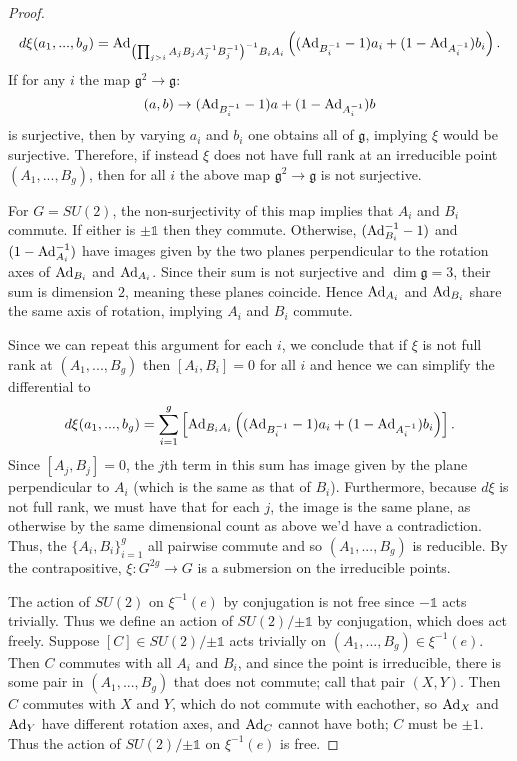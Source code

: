 \begin{proof}
		\begin{equation}
			d\xi(a_1,...,b_g) = \text{Ad}_{\left(\prod_{j>i} A_jB_jA_j^{-1}B_j^{-1}\right)^{-1}B_iA_i} \left((\text{Ad}_{B_i^{-1}}-1)a_i + (1-\text{Ad}_{A_i^{-1}})b_i\right).
		\end{equation}
		If for any $i$ the map $\mathfrak{g}^2\to\mathfrak{g}$:
		\begin{equation}
			(a,b) \to (\text{Ad}_{B_i^{-1}} - 1)a + (1-\text{Ad}_{A_i^{-1}})b
		\end{equation}
		is surjective, then by varying $a_i$ and $b_i$ one obtains all of $\mathfrak{g}$, implying $\xi$ would be surjective. Therefore, if instead $\xi$ does not have full rank at an irreducible point $(A_1,...,B_g)$, then for all $i$ the above map $\mathfrak{g}^2\to\mathfrak{g}$ is not surjective.
		
		For $G=SU(2)$, the non-surjectivity of this map implies that $A_i$ and $B_i$ commute. If either is $\pm\mathds{1}$ then they commute. Otherwise, $(\text{Ad}_{B_i}^{-1}-1)$ and $(1-\text{Ad}_{A_i}^{-1})$ have images given by the two planes perpendicular to the rotation axes of $\text{Ad}_{B_i}$ and $\text{Ad}_{A_i}$. Since their sum is not surjective and $\dim\mathfrak{g}=3$, their sum is dimension $2$, meaning these planes coincide. Hence $\text{Ad}_{A_i}$ and $\text{Ad}_{B_i}$ share the same axis of rotation, implying $A_i$ and $B_i$ commute.
		
		Since we can repeat this argument for each $i$, we conclude that if $\xi$ is not full rank at $(A_1,...,B_g)$ then $[A_i,B_i]=0$ for all $i$ and hence we can simplify the differential to
		\begin{equation}
			d\xi(a_1,...,b_g) = \sum_{i=1}^g \left[
			\text{Ad}_{B_iA_i}\left((\text{Ad}_{B_i^{-1}}-1)a_i + (1-\text{Ad}_{A_i^{-1}})b_i\right)
			\right].
		\end{equation}
		Since $[A_j,B_j]=0$, the $j$th term in this sum has image given by the plane perpendicular to $A_i$ (which is the same as that of $B_i$). Furthermore, because $d\xi$ is not full rank, we must have that for each $j$, the image is the same plane, as otherwise by the same dimensional count as above we'd have a contradiction. Thus, the $\{A_i,B_i\}_{i=1}^{g}$ all pairwise commute and so $(A_1,...,B_g)$ is reducible. By the contrapositive, $\xi:G^{2g}\to G$ is a submersion on the irreducible points. 
		
		The action of $SU(2)$ on $\xi^{-1}(e)$ by conjugation is not free since $-\mathds{1}$ acts trivially. Thus we define an action of $SU(2)/{\pm \mathds{1}}$ by conjugation, which does act freely. Suppose $[C]\in SU(2)/{\pm \mathds{1}}$ acts trivially on $(A_1,...,B_g)\in \xi^{-1}(e)$. Then $C$ commutes with all $A_i$ and $B_i$, and since the point is irreducible, there is some pair in $(A_1,...,B_g)$ that does not commute; call that pair $(X,Y)$. Then $C$ commutes with $X$ and $Y$, which do not commute with eachother, so $\text{Ad}_X$ and $\text{Ad}_Y$ have different rotation axes, and $\text{Ad}_C$ cannot have both; $C$ must be $\pm 1$. Thus the action of $SU(2)/{\pm \mathds{1}}$ on $\xi^{-1}(e)$ is free.
		

\end{proof}
